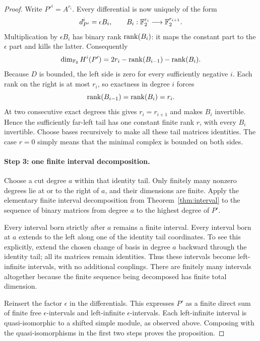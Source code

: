 \begin{proof}
Write $P'^i=A^{r_i}$. Every differential is now uniquely of the form
\[
 d_{P'}^i=\epsilon B_i,
 \qquad B_i:\mathbb F_2^{r_i}\longrightarrow\mathbb F_2^{r_{i+1}}.
\]
Multiplication by $\epsilon B_i$ has binary rank $\operatorname{rank}(B_i)$:
it maps the constant part to the $\epsilon$ part and kills the latter.
Consequently
\begin{equation}\label{eq:minimal-tail-rank}
 \dim_{\mathbb F_2}H^i(P')
  =2r_i-\operatorname{rank}(B_{i-1})-\operatorname{rank}(B_i).
\end{equation}
Because $D$ is bounded, the left side is zero for every sufficiently
negative $i$. Each rank on the right is at most $r_i$, so exactness in
degree $i$ forces
\[
 \operatorname{rank}(B_{i-1})=\operatorname{rank}(B_i)=r_i.
\]
At two consecutive exact degrees this gives $r_i=r_{i+1}$ and makes
$B_i$ invertible. Hence the sufficiently far-left tail has one constant
finite rank $r$, with every $B_i$ invertible. Choose bases recursively
to make all these tail matrices identities. The case $r=0$ simply
means that the minimal complex is bounded on both sides.

\paragraph{Step 3: one finite interval decomposition.}
Choose a cut degree $a$ within that identity tail. Only finitely many
nonzero degrees lie at or to the right of $a$, and their dimensions
are finite. Apply the elementary finite interval decomposition from
Theorem~\ref{thm:interval} to the sequence of binary matrices from
degree $a$ to the highest degree of $P'$.

Every interval born strictly after $a$ remains a finite interval.
Every interval born at $a$ extends to the left along one of the
identity tail coordinates. To see this explicitly, extend the
chosen change of basis in degree $a$ backward through the identity
tail; all its matrices remain identities. Thus these intervals
become left-infinite intervals, with no additional couplings.
There are finitely many intervals altogether because the finite
sequence being decomposed has finite total dimension.

Reinsert the factor $\epsilon$ in the differentials. This expresses
$P'$ as a finite direct sum of finite free $\epsilon$-intervals and
left-infinite $\epsilon$-intervals. Each left-infinite interval is
quasi-isomorphic to a shifted simple module, as observed above.
Composing with the quasi-isomorphisms in the first two steps proves
the proposition.
\end{proof}

